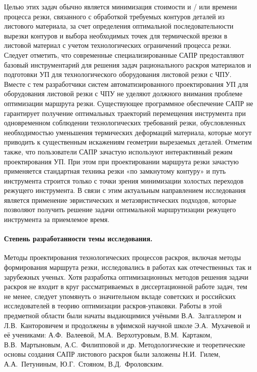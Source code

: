 Целью этих задач обычно является минимизация стоимости и / или времени процесса резки,
связанного с обработкой требуемых контуров деталей из листового материала,
за счет определения оптимальной последовательности вырезки контуров
и выбора необходимых точек для термической врезки в листовой материал
с учетом технологических ограничений процесса резки.
Следует отметить, что современные специализированные САПР предоставляют
базовый инструментарий для решения задач рационального раскроя материалов
и подготовки УП для технологического оборудования листовой резки с ЧПУ.
Вместе с тем разработчики систем автоматизированного проектирования УП
для оборудования листовой резки с ЧПУ не уделяют должного внимания
проблеме оптимизации маршрута резки.
Существующее программное обеспечение САПР не гарантирует
получение оптимальных траекторий перемещения инструмента
при одновременном соблюдении технологических требований резки,
обусловленных необходимостью уменьшения термических деформаций материала,
которые могут приводить к существенным искажениям геометрии вырезаемых деталей.
Отметим также, что пользователи САПР зачастую используют интерактивный режим проектирования УП.
При этом при проектировании маршрута резки зачастую применяется
стандартная техника резки «по замкнутому контуру» и путь инструмента строится
только с точки зрения минимизации холостых переходов режущего инструмента.
В связи с этим актуальным направлением
исследования является применение эвристических и метаэвристических подходов,
которые позволяют получить решение задачи
оптимальной маршрутизации
режущего инструмента
за приемлемое время.

\paragraph*{Степень разработанности темы исследования.}

Методы проектирования технологических процессов раскроя,
включая методы формирования маршрута резки, исследовались в работах как отечественных так и зарубежных ученых.
Хотя разработка оптимизационных методов решения задачи раскроя не входит в круг рассматриваемых в диссертационной работе задач,
тем не менее, следует упомянуть о значительном вкладе советских и российских исследователей
в теорию оптимизации раскроя-упаковки.
Работы в этой предметной области были начаты выдающимися учёными
В.А.~Залгаллером и Л.В.~Канторовичем
и продолжены в уфимской научной школе
Э.А.~Мухачевой и её учениками:
А.Ф.~Валеевой, М.А.~Верхотуровым, В.М.~Картаком, В.В.~Мартыновым, А.С.~Филипповой и др.
Методологические и теоретические основы создания САПР листового раскроя были заложены
Н.И.~Гилем, А.А.~Петуниным, Ю.Г.~Стояном, В.Д.~Фроловским.

